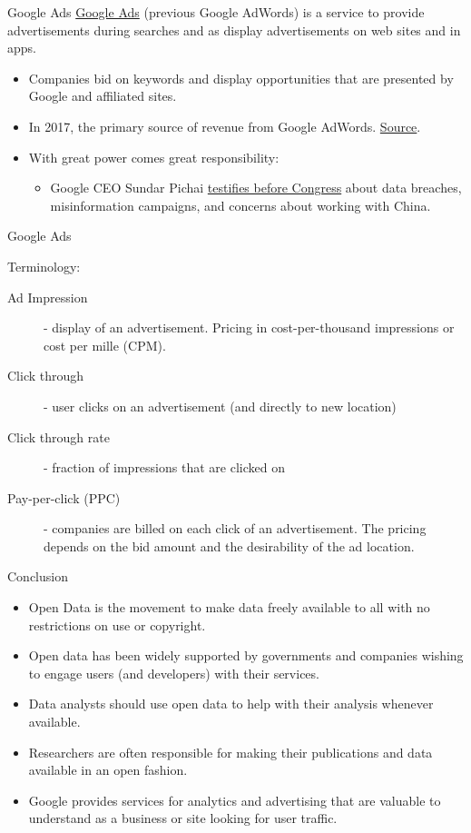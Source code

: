 \documentclass[xcolor=svgnames]{beamer}
\newcommand{\nl}{\\[1em]}
\begin{document}
\begin{frame}{Google Ads}
\href{https://ads.google.com/intl/en\_CA/home/}{Google Ads} (previous Google AdWords) is a service to provide advertisements during searches and as display advertisements on web sites and in apps. 

\begin{itemize}
\item Companies bid on keywords and display opportunities that are presented by Google and affiliated sites.\nl
\item In 2017, the primary source of revenue from Google AdWords. \href{https://www.investopedia.com/articles/investing/020515/business-google.asp}{Source}.\nl
\item With great power comes great responsibility:
\begin{itemize}
\item Google CEO Sundar Pichai \href{https://www.youtube.com/watch?v=8qS7eyUo\_uk}{testifies before Congress} about data breaches, misinformation campaigns, and concerns about working with China. \nl
\end{itemize}
\end{itemize}
\end{frame}

\begin{frame}{Google Ads}


Terminology:
\begin{description}
\item[Ad Impression] - display of an advertisement. Pricing in cost-per-thousand impressions or cost per mille (CPM).
\item[Click through] - user clicks on an advertisement (and directly to new location)
\item[Click through rate] - fraction of impressions that are clicked on
\item[Pay-per-click (PPC)] - companies are billed on each click of an advertisement. The pricing depends on the bid amount and the desirability of the ad location.
\end{description}

\end{frame}



\begin{frame}{Conclusion}
\begin{itemize}
\item Open Data is the movement to make data freely available to all with no restrictions on use or copyright.\medskip
\item Open data has been widely supported by governments and companies wishing to engage users (and developers) with their services.\medskip
\item Data analysts should use open data to help with their analysis whenever available.\medskip
\item Researchers are often responsible for making their publications and data available in an open fashion.\medskip
\item Google provides services for analytics and advertising that are valuable to understand as a business or site looking for user traffic.
\end{itemize}
\end{frame}
\end{document}
